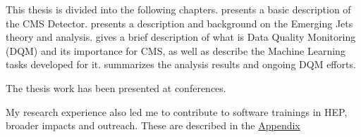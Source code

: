 This thesis is divided into the following chapters.
 presents a basic description of the CMS Detector.
 presents a description and background on the Emerging Jets theory and analysis.
 gives a brief description of what is Data Quality Monitoring (DQM) and its importance for CMS, as well as describe the Machine Learning tasks developed for it.
 summarizes the analysis results and ongoing DQM efforts.



The thesis work has been presented at conferences.
\cite{user-meeting2023,prism2022,DPF,prism2019}

My research experience also led me to contribute to software trainings in HEP, broader impacts and outreach.
These are described in the \hyperlink{appendix}{Appendix}

